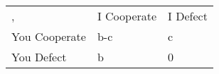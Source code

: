 \begin{table}[h]
\begin{tabular}{lll}
,             & I Cooperate & I Defect \\
You Cooperate & b-c         & c        \\
You Defect    & b           & 0       
\end{tabular}
\end{table}